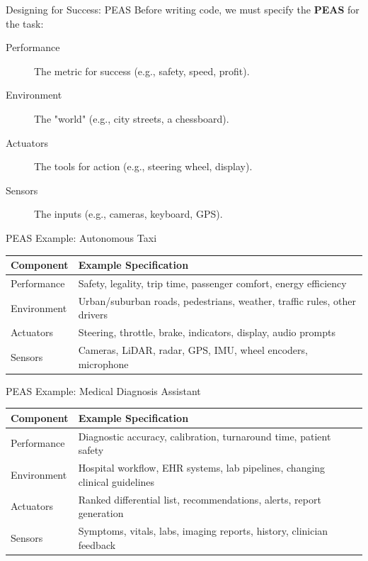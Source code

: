 \documentclass[10pt]{beamer}
\begin{document}
\begin{frame}{Designing for Success: PEAS}
    Before writing code, we must specify the \textbf{PEAS} for the task:
    \begin{description}
        \item[Performance] The metric for success (e.g., safety, speed, profit).
        \item[Environment] The "world" (e.g., city streets, a chessboard).
        \item[Actuators] The tools for action (e.g., steering wheel, display).
        \item[Sensors] The inputs (e.g., cameras, keyboard, GPS).
    \end{description}
\end{frame}

\begin{frame}{PEAS Example: Autonomous Taxi}
    \small
    \begin{tabular}{p{2.2cm}p{8.1cm}}
        \toprule
        \textbf{Component} & \textbf{Example Specification} \\
        \midrule
        Performance & Safety, legality, trip time, passenger comfort, energy efficiency \\
        Environment & Urban/suburban roads, pedestrians, weather, traffic rules, other drivers \\
        Actuators & Steering, throttle, brake, indicators, display, audio prompts \\
        Sensors & Cameras, LiDAR, radar, GPS, IMU, wheel encoders, microphone \\
        \bottomrule
    \end{tabular}
\end{frame}

\begin{frame}{PEAS Example: Medical Diagnosis Assistant}
    \small
    \begin{tabular}{p{2.2cm}p{8.1cm}}
        \toprule
        \textbf{Component} & \textbf{Example Specification} \\
        \midrule
        Performance & Diagnostic accuracy, calibration, turnaround time, patient safety \\
        Environment & Hospital workflow, EHR systems, lab pipelines, changing clinical guidelines \\
        Actuators & Ranked differential list, recommendations, alerts, report generation \\
        Sensors & Symptoms, vitals, labs, imaging reports, history, clinician feedback \\
        \bottomrule
    \end{tabular}
\end{frame}
\end{document}
